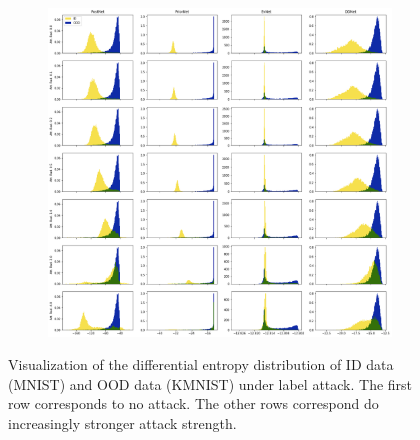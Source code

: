 \begin{figure}[ht!]
    \centering
        \begin{subfigure}[t]{1.0\textwidth}
        \centering
        \includegraphics[width=0.99 \textwidth]{sections/008_icml2021/eval/unc_dist_label_id_mnist_c.png}
    \end{subfigure}%
    \caption{Visualization of the differential entropy distribution of ID data (MNIST) and OOD data (KMNIST) under label attack. The first row corresponds to no attack. The other rows correspond do increasingly stronger attack strength.}
    \label{fig:attaked_samples_idood_label_attacks_3}
	\vspace{-.5cm}
\end{figure}
\newpage

